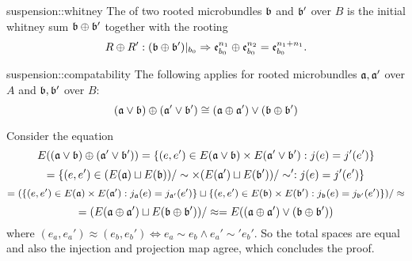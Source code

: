 \begin{mydefinition}{suspension::whitney}
    The  of two rooted microbundles $\bb$ and $\bb'$ over $B$
    is the initial whitney sum $\whitney{\bb}{\bb'}$ together with the rooting
    \[ \germdef{\whitney{R}{R'}}{(\whitney{\bb}{\bb'})\restr{b_0}}{\whitney{\be[n_1]_{b_0}}{\be[n_2]_{b_0}} = \be[n_1 + n_1]_{b_0}}. \]
\end{mydefinition}

\begin{mylemma}{suspension::compatability}   
    The following applies for rooted microbundles $\ba, \ba'$ over $A$ and $\bb, \bb'$ over $B$: 
    \[ \whitney{(\ba \vee \bb)}{(\ba' \vee \bb')} \cong (\whitney{\ba}{\ba'}) \vee (\whitney{\bb}{\bb'}) \]
\end{mylemma}
\begin{myproof}
    Consider the equation
    \[ E(\whitney{(\ba \vee \bb)}{(\ba' \vee \bb')}) = \set{(e, e') \in E(\ba \vee \bb) \times E(\ba' \vee \bb')}{j(e) = j'(e')} \]
    \[ = \set{(e, e') \in (E(\ba) \sqcup E(\bb)) / \sim \times (E(\ba') \sqcup E(\bb')) / \sim'}{j(e) = j'(e')} \]
    \[ = (\set{(e, e') \in E(\ba) \times E(\ba')}{j_\ba(e) = j_{\ba'}(e')} \sqcup \set{(e, e') \in E(\bb) \times E(\bb')}{j_\bb(e) = j_{\bb'}(e')}) / \approx \]
    \[ = (E(\whitney{\ba}{\ba'}) \sqcup E(\whitney{\bb}{\bb'})) / \approx = E((\whitney{\ba}{\ba'}) \vee (\whitney{\bb}{\bb'}))\]
    where $(e_a, e_a') \approx (e_b, e_b') \iff e_a \sim e_b \land e_a' \sim' e_b'$.
    So the total spaces are equal and also the injection and projection map agree, which concludes the proof.
\end{myproof}